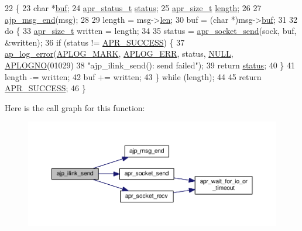 \begin{DoxyCode}
22 \{
23     \textcolor{keywordtype}{char}         *\hyperlink{group__APACHE__CORE__PROTO_ga17bc47ccf1b618ed082a4ff4f2cc7f7e}{buf};
24     \hyperlink{group__apr__errno_gaa5105fa83cc322f09382292db8b47593}{apr\_status\_t} \hyperlink{group__APACHE__CORE__HTTPD_ga6e27f49150e9a14580fb313cc2777e00}{status};
25     \hyperlink{group__apr__platform_gaaa72b2253f6f3032cefea5712a27540e}{apr\_size\_t}   \hyperlink{group__APACHE__CORE__PROTO_gae8609cee12b4a979fa07fe431b3ee0fb}{length};
26 
27     \hyperlink{group__AJP__api_gad2b6d66e5dbf8369ab3d2e64adf81232}{ajp\_msg\_end}(msg);
28 
29     length = msg->\hyperlink{structajp__msg_ab31fbddb808b5f3c0549cdb0f39639cf}{len};
30     buf    = (\textcolor{keywordtype}{char} *)msg->\hyperlink{structajp__msg_a7343b1803e9177dccb3c4716a5e12c3a}{buf};
31 
32     \textcolor{keywordflow}{do} \{
33         \hyperlink{group__apr__platform_gaaa72b2253f6f3032cefea5712a27540e}{apr\_size\_t} written = length;
34 
35         status = \hyperlink{unix_2sendrecv_8c_a943268245cf59f6ff8cf1458c9a9ba8d}{apr\_socket\_send}(sock, buf, &written);
36         \textcolor{keywordflow}{if} (status != \hyperlink{group__apr__errno_ga9ee311b7bf1c691dc521d721339ee2a6}{APR\_SUCCESS}) \{
37             \hyperlink{group__APACHE__CORE__LOG_ga5e6676c87418af7a1d323a116c78ecb4}{ap\_log\_error}(\hyperlink{group__APACHE__CORE__LOG_ga655e126996849bcb82e4e5a14c616f4a}{APLOG\_MARK}, \hyperlink{group__APACHE__CORE__LOG_ga57ad94ed8c92c4306de90479251a5d58}{APLOG\_ERR}, status, 
      \hyperlink{pcre_8txt_ad7f989d16aa8ca809a36bc392c07fba1}{NULL}, \hyperlink{group__APACHE__CORE__LOG_ga1dee8a07e06bc5b3de8b89662c2cd666}{APLOGNO}(01029)
38                           \textcolor{stringliteral}{"ajp\_ilink\_send(): send failed"});
39             \textcolor{keywordflow}{return} \hyperlink{group__APACHE__CORE__HTTPD_ga6e27f49150e9a14580fb313cc2777e00}{status};
40         \}
41         length -= written;
42         buf    += written;
43     \} \textcolor{keywordflow}{while} (length);
44 
45     \textcolor{keywordflow}{return} \hyperlink{group__apr__errno_ga9ee311b7bf1c691dc521d721339ee2a6}{APR\_SUCCESS};
46 \}
\end{DoxyCode}


Here is the call graph for this function\+:
\nopagebreak
\begin{figure}[H]
\begin{center}
\leavevmode
\includegraphics[width=350pt]{group__AJP__api_gae3b577e976125797a58790e35021a965_cgraph}
\end{center}
\end{figure}




